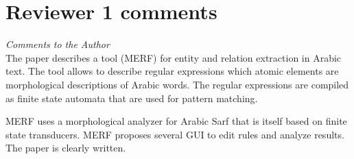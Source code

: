 \section*{Reviewer 1 comments}
\textit{Comments to the Author}\\


The paper describes a tool (MERF) for entity and relation 
extraction in Arabic text.
The tool allows to describe regular expressions which atomic 
elements are morphological descriptions of Arabic words.
The regular expressions are compiled as finite state 
automata that are used for pattern matching.

MERF uses a morphological analyzer for Arabic Sarf that 
is itself based on finite state transducers.
MERF proposes several GUI to edit rules and analyze results.
The paper is clearly written. 


